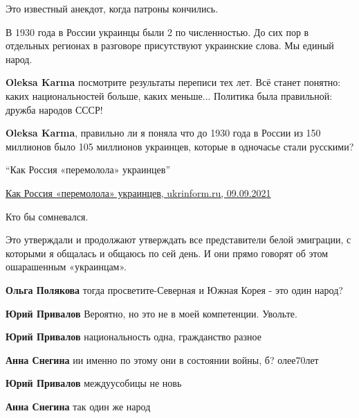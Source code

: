 \begin{itemize}
\begin{itemize}
Это известный анекдот, когда патроны кончились.
\end{itemize} %


В 1930 года в России украинцы были 2 по численностью. До сих пор в отдельных
регионах в разговоре присутствуют украинские слова. Мы единый народ.

\begin{itemize} %
\textbf{Oleksa Karma} посмотрите результаты переписи тех лет. Всё станет понятно: каких национальностей больше, каких меньше... Политика была правильной: дружба народов СССР!

\textbf{Oleksa Karma}, правильно ли я поняла что до 1930 года в России из 150 миллионов было 105 миллионов украинцев, которые в одночасье стали русскими?

\enquote{Как Россия «перемолола» украинцев}

\href{https://www.ukrinform.ru/amp/rubric-antifake/3312829-kak-rossia-peremolola-ukraincev.html}{%
Как Россия «перемолола» украинцев, ukrinform.ru, 09.09.2021%
}

\end{itemize} %

Кто бы сомневался.


Это утверждали и продолжают утверждать все представители белой эмиграции, с
которыми я общалась и общаюсь по сей день. И они прямо говорят об этом
ошарашенным «украинцам».

\begin{itemize} %
\textbf{Ольга Полякова} тогда просветите-Северная и Южная Корея - это один народ?

\textbf{Юрий Привалов} Вероятно, но это не в моей компетенции. Увольте.

\textbf{Юрий Привалов} национальность одна, гражданство разное

\textbf{Анна Снегина} ии именно по этому они в состоянии войны, б? олее70лет

\textbf{Юрий Привалов} междуусобицы не новь

\textbf{Анна Снегина} так один же народ
\end{itemize} %


\end{itemize}
